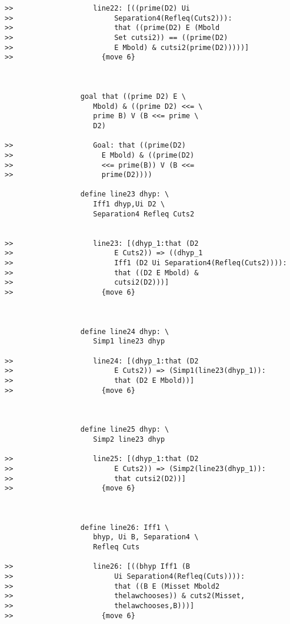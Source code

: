 \documentclass[12pt]{article}
\begin{document}
\begin{verbatim}
>>                   line22: [((prime(D2) Ui
>>                        Separation4(Refleq(Cuts2))):
>>                        that ((prime(D2) E (Mbold
>>                        Set cutsi2)) == ((prime(D2)
>>                        E Mbold) & cutsi2(prime(D2)))))]
>>                     {move 6}



                  goal that ((prime D2) E \
                     Mbold) & ((prime D2) <<= \
                     prime B) V (B <<= prime \
                     D2)

>>                   Goal: that ((prime(D2)
>>                     E Mbold) & ((prime(D2)
>>                     <<= prime(B)) V (B <<=
>>                     prime(D2))))

                  define line23 dhyp: \
                     Iff1 dhyp,Ui D2 \
                     Separation4 Refleq Cuts2


>>                   line23: [(dhyp_1:that (D2
>>                        E Cuts2)) => ((dhyp_1
>>                        Iff1 (D2 Ui Separation4(Refleq(Cuts2)))):
>>                        that ((D2 E Mbold) &
>>                        cutsi2(D2)))]
>>                     {move 6}



                  define line24 dhyp: \
                     Simp1 line23 dhyp

>>                   line24: [(dhyp_1:that (D2
>>                        E Cuts2)) => (Simp1(line23(dhyp_1)):
>>                        that (D2 E Mbold))]
>>                     {move 6}



                  define line25 dhyp: \
                     Simp2 line23 dhyp

>>                   line25: [(dhyp_1:that (D2
>>                        E Cuts2)) => (Simp2(line23(dhyp_1)):
>>                        that cutsi2(D2))]
>>                     {move 6}



                  define line26: Iff1 \
                     bhyp, Ui B, Separation4 \
                     Refleq Cuts

>>                   line26: [((bhyp Iff1 (B
>>                        Ui Separation4(Refleq(Cuts)))):
>>                        that ((B E (Misset Mbold2
>>                        thelawchooses)) & cuts2(Misset,
>>                        thelawchooses,B)))]
>>                     {move 6}




\end{verbatim}
\end{document}
